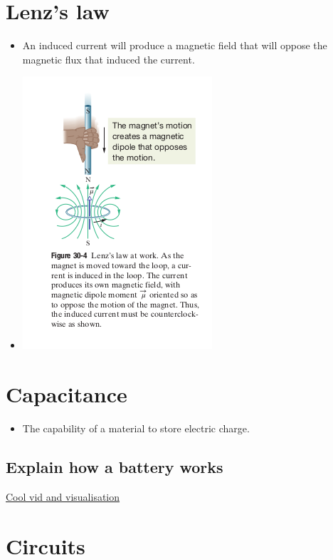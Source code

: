 \documentclass[11pt]{article}
\begin{document}
\hypertarget{lenzs-law}{%
\section{Lenz's law}\label{lenzs-law}}

\begin{itemize}
\tightlist
\item
  An induced current will produce a magnetic field that will oppose the
  magnetic flux that induced the current.
\item
  \includegraphics{physics/img/lenzlaw.png}
\end{itemize}

\hypertarget{capacitance}{%
\section{Capacitance}\label{capacitance}}

\begin{itemize}
\tightlist
\item
  The capability of a material to store electric charge.
\end{itemize}

\hypertarget{explain-how-a-battery-works}{%
\subsection{Explain how a battery
works}\label{explain-how-a-battery-works}}

\href{https://www.youtube.com/watch?v=4-1psMHSpKs}{Cool vid and
visualisation}

\hypertarget{circuits}{%
\section{Circuits}\label{circuits}}
\end{document}
